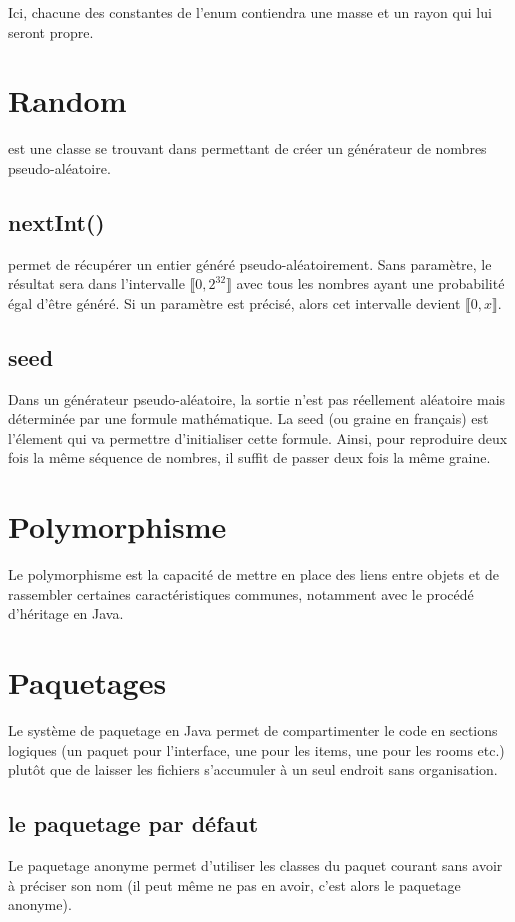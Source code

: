 Ici, chacune des constantes de l'enum  contiendra une masse et un rayon qui lui seront propre.

\section{Random}

 est une classe se trouvant dans  permettant de créer un générateur de nombres pseudo-aléatoire.

\subsection{nextInt()}

 permet de récupérer un entier généré pseudo-aléatoirement. Sans paramètre, le résultat sera dans l'intervalle $\llbracket 0, 2^{32} \rrbracket$ avec tous les nombres ayant une probabilité égal d'être généré. Si un paramètre  est précisé, alors cet intervalle devient $\llbracket 0, x \rrbracket$.

\subsection{seed}

Dans un générateur pseudo-aléatoire, la sortie n'est pas réellement aléatoire mais déterminée par une formule mathématique. La seed (ou graine en français) est l'élement qui va permettre d'initialiser cette formule. Ainsi, pour reproduire deux fois la même séquence de nombres, il suffit de passer deux fois la même graine.

\section{Polymorphisme}

Le polymorphisme est la capacité de mettre en place des liens entre objets et de rassembler certaines caractéristiques communes, notamment avec le procédé d'héritage en Java.

\section{Paquetages}

Le système de paquetage en Java permet de compartimenter le code en sections logiques (un paquet pour l'interface, une pour les items, une pour les rooms etc.) plutôt que de laisser les fichiers s'accumuler à un seul endroit sans organisation.

\subsection{le paquetage par défaut}

Le paquetage anonyme permet d'utiliser les classes du paquet courant sans avoir à préciser son nom (il peut même ne pas en avoir, c'est alors le paquetage anonyme).
